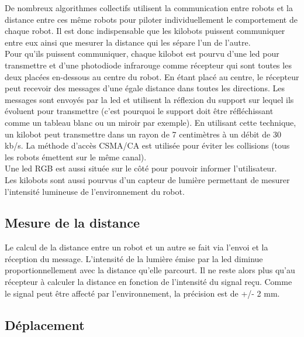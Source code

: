 \documentclass[a4paper,8pt]{report}
\begin{document}
De nombreux algorithmes collectifs utilisent la communication entre robots et la distance entre ces m\^eme robots pour piloter individuellement le comportement de chaque robot. Il est donc indispensable que les kilobots puissent communiquer entre eux ainsi que mesurer la distance qui les s\'epare l'un de l'autre. \\
Pour qu'ils puissent communiquer, chaque kilobot est pourvu d'une led pour transmettre et d'une photodiode infrarouge comme r\'ecepteur qui sont toutes les deux plac\'ees en-dessous au centre du robot. En \'etant plac\'e au centre, le r\'ecepteur peut recevoir des messages d'une \'egale distance dans toutes les directions. Les messages sont envoy\'es par la led et utilisent la r\'eflexion du support sur lequel ils \'evoluent pour transmettre (c'est pourquoi le support doit \^etre r\'efl\'echissant comme un tableau blanc ou un miroir par exemple). En utilisant cette technique, un kilobot peut transmettre dans un rayon de 7 centim\`etres \`a un d\'ebit de 30 kb/s. La m\'ethode d'acc\`es CSMA/CA est utilis\'ee pour \'eviter les collisions (tous les robots \'emettent sur le m\^eme canal).\\
Une led RGB est aussi situ\'ee sur le c\^ot\'e pour pouvoir informer l'utilisateur.\\

\medskip
Les kilobots sont aussi pourvus d'un capteur de lumi\`ere permettant de mesurer l'intensit\'e lumineuse de l'environnement du robot.\\

\subsection*{Mesure de la distance}\label{subsec:name}

Le calcul de la distance entre un robot et un autre se fait via l'envoi et la r\'eception du message. L'intensit\'e de la lumi\`ere \'emise par la led diminue proportionnellement avec la distance qu'elle parcourt. Il ne reste alors plus qu'au r\'ecepteur \`a calculer la distance en fonction de l'intensit\'e du signal re\c cu. Comme le signal peut \^etre affect\'e par l'environnement, la pr\'ecision est de +/- 2 mm.\\

\subsection*{D\'eplacement}\label{subsec:name}
\end{document}
